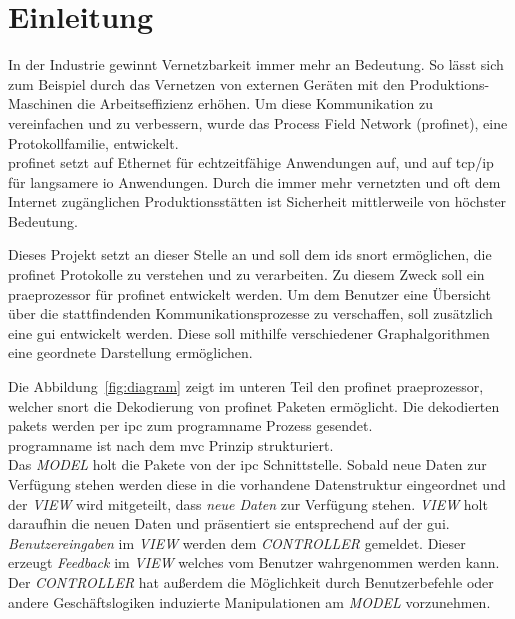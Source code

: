\chapter{Einleitung}

In der Industrie gewinnt Vernetzbarkeit immer mehr an Bedeutung. So lässt sich zum Beispiel durch das Vernetzen von externen Geräten mit den Produktions-Maschinen die Arbeitseffizienz erhöhen. Um diese Kommunikation zu vereinfachen und zu verbessern, wurde das Process Field Network (\gls{profinet}), eine Protokollfamilie, entwickelt.\\
\gls{profinet} setzt auf Ethernet für echtzeitfähige Anwendungen auf, und auf \gls{tcp}/\gls{ip} für langsamere \gls{io} Anwendungen. Durch die immer mehr vernetzten und oft dem Internet zugänglichen Produktionsstätten ist Sicherheit mittlerweile von höchster Bedeutung. \par
Dieses Projekt setzt an dieser Stelle an und soll dem \gls{ids} \gls{snort} ermöglichen, die \gls{profinet} Protokolle zu verstehen und zu verarbeiten. Zu diesem Zweck soll ein \gls{praeprozessor} für \gls{profinet} entwickelt werden. Um dem Benutzer eine Übersicht über die stattfindenden Kommunikationsprozesse zu verschaffen, soll zusätzlich eine \gls{gui} entwickelt werden. Diese soll mithilfe verschiedener Graphalgorithmen eine geordnete Darstellung ermöglichen.\par
Die Abbildung~\ref{fig:diagram} zeigt im unteren Teil den \gls{profinet} \gls{praeprozessor}, welcher \gls{snort} die Dekodierung von \gls{profinet} Paketen ermöglicht. Die dekodierten \glspl{paket} werden per \gls{ipc} zum \gls{programname} Prozess gesendet.\\
\Gls{programname} ist nach dem \gls{mvc} Prinzip strukturiert.\\
Das \textit{MODEL} holt die Pakete von der \gls{ipc} Schnittstelle. Sobald neue Daten zur Verfügung stehen werden diese in die vorhandene Datenstruktur eingeordnet und der \textit{VIEW} wird mitgeteilt, dass \textit{neue Daten} zur Verfügung stehen. \textit{VIEW} holt daraufhin die neuen Daten und präsentiert sie entsprechend auf der \gls{gui}.\\
\textit{Benutzereingaben} im \textit{VIEW} werden dem \textit{CONTROLLER} gemeldet. Dieser erzeugt \textit{Feedback} im \textit{VIEW} welches vom Benutzer wahrgenommen werden kann. Der \textit{CONTROLLER} hat außerdem die Möglichkeit durch Benutzerbefehle oder andere Geschäftslogiken induzierte Manipulationen am \textit{MODEL} vorzunehmen.

